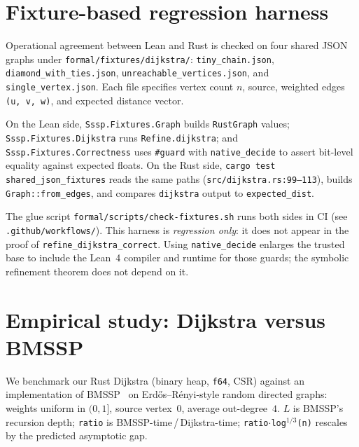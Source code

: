 \documentclass[11pt,a4paper]{article}
\newcommand{\Lean}{Lean~4\xspace}
\newcommand{\BMSSP}{\textsc{BMSSP}\xspace}
\newcommand{\Dijkstra}{Dijkstra\xspace}
\newcommand{\code}[1]{\texttt{#1}}
\theoremstyle{plain}
\theoremstyle{definition}
\begin{document}
\section{Fixture-based regression harness}\label{sec:fixtures}

Operational agreement between Lean and Rust is checked on four shared JSON
graphs under \code{formal/fixtures/dijkstra/}:
\code{tiny\_chain.json}, \code{diamond\_with\_ties.json},
\code{unreachable\_vertices.json}, and \code{single\_vertex.json}.
Each file specifies vertex count $n$, source, weighted edges
\code{(u, v, w)}, and expected distance vector.

On the Lean side, \code{Sssp.Fixtures.Graph} builds \code{RustGraph} values;
\code{Sssp.Fixtures.Dijkstra} runs \code{Refine.dijkstra}; and
\code{Sssp.Fixtures.Correctness} uses \code{\#guard} with
\code{native\_decide} to assert bit-level equality against expected floats.
On the Rust side, \code{cargo test shared\_json\_fixtures} reads the same
paths (\code{src/dijkstra.rs:99--113}), builds \code{Graph::from\_edges}, and
compares \code{dijkstra} output to \code{expected\_dist}.

The glue script \code{formal/scripts/check-fixtures.sh} runs both sides in CI
(see \code{.github/workflows/}). This harness is \emph{regression only}: it
does not appear in the proof of \code{refine\_dijkstra\_correct}.
Using \code{native\_decide} enlarges the trusted base to include the \Lean{}
compiler and runtime for those guards; the symbolic refinement theorem does
not depend on it.

\section{Empirical study: \Dijkstra{} versus \BMSSP}\label{sec:benchmark}

We benchmark our Rust \Dijkstra{} (binary heap, \code{f64}, CSR) against an
implementation of \BMSSP{}~\cite{DuanMaoMaoShuYin2025} on Erdős--Rényi-style
random directed graphs: weights uniform in $(0,1]$, source vertex~$0$, average
out-degree~$4$. $L$ is \BMSSP{}'s recursion depth; \code{ratio} is
\BMSSP-time\,/\,\Dijkstra-time; \code{ratio$\cdot$log$^{1/3}$(n)} rescales by
the predicted asymptotic gap.
\end{document}
